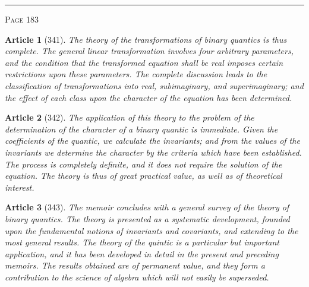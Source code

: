 \documentclass[11pt,a4paper]{article}
\theoremstyle{cayley}
\newtheorem{art}{Article}
\begin{document}
\vspace{1em}
\noindent\rule{\textwidth}{0.4pt}
\begin{center}\textsc{Page 183}\end{center}
\newpage

\begin{art}[341]
The theory of the transformations of binary quantics is thus complete. The general linear transformation involves four arbitrary parameters, and the condition that the transformed equation shall be real imposes certain restrictions upon these parameters. The complete discussion leads to the classification of transformations into real, subimaginary, and superimaginary; and the effect of each class upon the character of the equation has been determined.
\end{art}

\begin{art}[342]
The application of this theory to the problem of the determination of the character of a binary quantic is immediate. Given the coefficients of the quantic, we calculate the invariants; and from the values of the invariants we determine the character by the criteria which have been established. The process is completely definite, and it does not require the solution of the equation. The theory is thus of great practical value, as well as of theoretical interest.
\end{art}

\begin{art}[343]
The memoir concludes with a general survey of the theory of binary quantics. The theory is presented as a systematic development, founded upon the fundamental notions of invariants and covariants, and extending to the most general results. The theory of the quintic is a particular but important application, and it has been developed in detail in the present and preceding memoirs. The results obtained are of permanent value, and they form a contribution to the science of algebra which will not easily be superseded.
\end{art}
\end{document}
